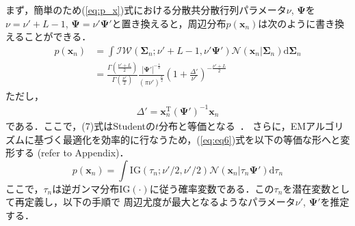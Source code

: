 \documentclass[journal]{IEEEtran}
\begin{document}
まず，簡単のため(\ref{eq:p_x})式における分散共分散行列パラメータ$\nu$, $\bm \Psi$を$\nu= \nu' +L-1$, $\bm \Psi = \nu' \bm{\Psi}'$と置き換えると，周辺分布$p(\mathbf{x}_n)$は次のように書き換えることができる．
\begin{align}%
\label{eq:eq6}
p(\mathbf{x}_n) &=\int \mathcal{IW}(\bm{\Sigma}_n; \nu'+L-1, \nu' \bm{\Psi}') \mathcal{N}(\mathbf{x}_n|\bm{\Sigma}_n) \mathrm{d} {\bm{\Sigma}_n} \\
\label{eq:eq7}
&=\frac{\Gamma(\frac{\nu'+L}{2})}{\Gamma(\frac{\nu'}{2})} \frac{|{\bm \Psi'}|^{-\frac{1}{2}}}{\left(\pi \nu' \right)^{\frac{L}{2}}} \left(1+\frac{\Delta '}{\nu '} \right)^{-\frac{\nu'+L}{2}}
\end{align}
ただし，
\begin{eqnarray}
	\Delta ' = \mathbf{x}_n^\mathrm{T} ({\bm \Psi '})^{-1} \mathbf{x}_n
\end{eqnarray}
である．ここで，(7)式はStudentの$t$分布と等価となる~\cite{t2006}．
さらに，EMアルゴリズムに基づく最適化を効率的に行なうため，(\ref{eq:eq6})式を以下の等価な形へと変形する (refer to Appendix)．
\begin{equation}%
\label{eq:eq9}
		p(\mathbf{x}_n) = \int \mathrm{IG}(\tau_n;\nu'/2,\nu'/2) \mathcal{N}(\mathbf{x}_n|\tau_n \mathbf{\Psi}') \mathrm{d}{\tau_n}
\end{equation}
ここで，$\tau_n$は逆ガンマ分布$\mathrm{IG}(\cdot)$に従う確率変数である．この$\tau_n$を潜在変数として再定義し，以下の手順で
周辺尤度が最大となるようなパラメータ$\nu'$, ${\bm \Psi'}$を推定する．
\end{document}
